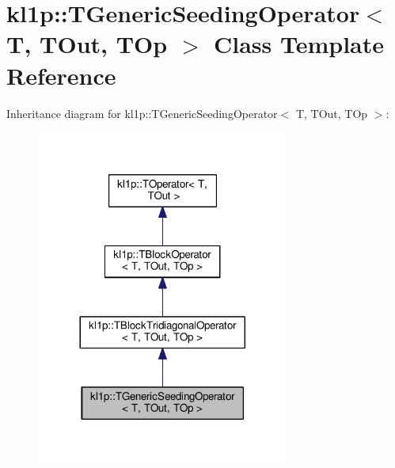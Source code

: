 \hypertarget{classkl1p_1_1TGenericSeedingOperator}{}\section{kl1p\+:\+:T\+Generic\+Seeding\+Operator$<$ T, T\+Out, T\+Op $>$ Class Template Reference}
\label{classkl1p_1_1TGenericSeedingOperator}


Inheritance diagram for kl1p\+:\+:T\+Generic\+Seeding\+Operator$<$ T, T\+Out, T\+Op $>$\+:
\nopagebreak
\begin{figure}[H]
\begin{center}
\leavevmode
\includegraphics[width=236pt]{classkl1p_1_1TGenericSeedingOperator__inherit__graph}
\end{center}
\end{figure}


